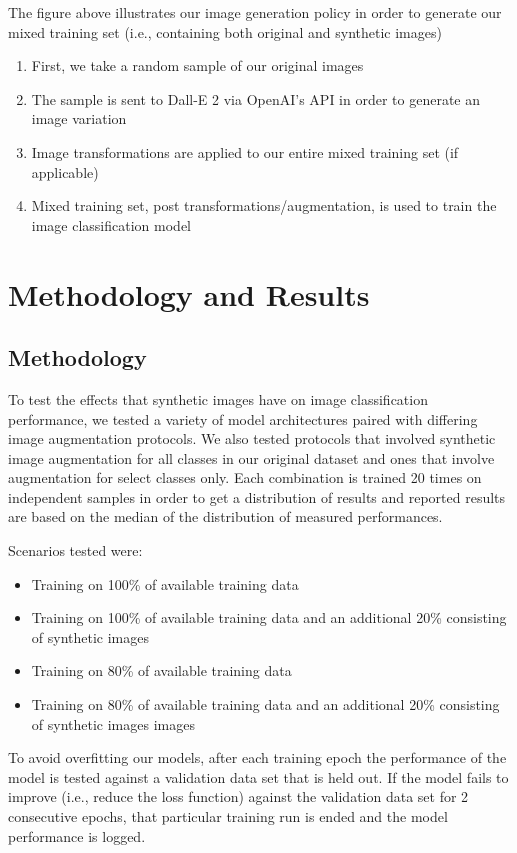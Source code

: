 \documentclass [MAS] {uclathes}
\begin{document}
The figure above illustrates our image generation policy in order to generate our mixed training set (i.e., containing 
both original and synthetic images)
\begin{enumerate}
    \item First, we take a random sample of our original images
    \item The sample is sent to Dall-E 2 via OpenAI's API in order to generate an image variation
    \item Image transformations are applied to our entire mixed training set (if applicable)
    \item Mixed training set, post transformations/augmentation, is used to train the image classification model
\end{enumerate}

\chapter{Methodology and Results}

\section{Methodology}
To test the effects that synthetic images have on image classification performance, we tested a variety of model 
architectures paired with differing image augmentation protocols. We also tested protocols that involved synthetic 
image augmentation for all classes in our original dataset and ones that involve augmentation for select classes only. 
Each combination is trained 20 times on independent samples in order to get a distribution of results and reported 
results are based on the median of the distribution of measured performances.

Scenarios tested were:
\begin{itemize}
    \item Training on 100\% of available training data
    \item Training on 100\% of available training data and an additional 20\% consisting of synthetic images
    \item Training on 80\% of available training data
    \item Training on 80\% of available training data and an additional 20\% consisting of synthetic images
    images
\end{itemize}

To avoid overfitting our models, after each training epoch the performance of the model is tested against a validation 
data set that is held out. If the model fails to improve (i.e., reduce the loss function) against the validation data 
set for 2 consecutive epochs, that particular training run is ended and the model performance is logged.
\end{document}
